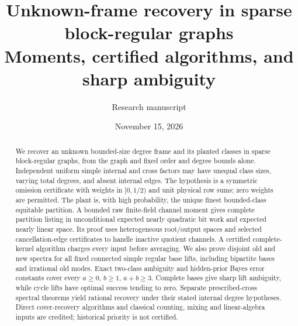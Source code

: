 \documentclass[11pt]{article}
\title{Unknown-frame recovery in sparse block-regular graphs\\Moments, certified algorithms, and sharp ambiguity}
\author{Research manuscript}
\date{November 15, 2026}
\theoremstyle{remark}
\begin{document}
\maketitle
\begin{abstract}
We recover an unknown bounded-size degree frame and its planted classes
in sparse block-regular graphs, from the graph and fixed order and degree
bounds alone. Independent uniform simple internal and cross factors may
have unequal class sizes, varying total degrees, and absent internal
edges. The hypothesis is a symmetric omission certificate with weights
in $[0,1/2)$ and unit physical row sums; zero weights are permitted.
The plant is, with high probability, the unique finest bounded-class
equitable partition. A bounded raw finite-field channel moment gives
complete partition listing in unconditional expected nearly quadratic
bit work and expected nearly linear space. Its proof uses heterogeneous
root/output spaces and selected cancellation-edge certificates to handle
inactive quotient channels. A certified complete-kernel algorithm
charges every input before averaging. We also prove disjoint old and
new spectra for all fixed connected simple regular base lifts, including
bipartite bases and irrational old modes. Exact two-class ambiguity and
hidden-prior Bayes error constants cover every $a\ge0$, $b\ge1$,
$a+b\ge3$. Complete bases give sharp lift ambiguity, while cycle lifts
have optimal success tending to zero. Separate prescribed-cross
spectral theorems yield rational recovery under their stated internal
degree hypotheses. Direct cover-recovery algorithms and classical
counting, mixing and linear-algebra inputs are credited; historical
priority is not certified.
\end{abstract}
\tableofcontents















\appendix


\end{document}
